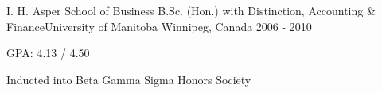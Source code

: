 \begin{cventries}
  \cventry
    {I. H. Asper School of Business} %
    {B.Sc. (Hon.) with Distinction, Accounting \& Finance{\enskip\cdotp\enskip}University of Manitoba} %
    {Winnipeg, Canada} %
    {2006 - 2010} %
    {
      \begin{cvitems} %
        \item {GPA: 4.13 / 4.50}
        \item {Inducted into Beta Gamma Sigma Honors Society}
      \end{cvitems}
    }

\end{cventries}
